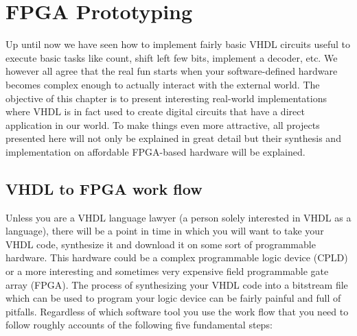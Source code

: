 \documentclass[13pt]{extreport}
\begin{document}

\renewcommand\contentsname{Table of Contents}
\tableofcontents

\chapter{FPGA Prototyping}
Up until now we have seen how to implement fairly basic VHDL circuits useful to execute basic tasks like count, shift left few bits, implement a decoder, etc. We however all agree that the real fun starts when your software-defined hardware becomes complex enough to actually interact with the external world.
The objective of this chapter is to present interesting real-world implementations where VHDL is in fact used to create digital circuits that have a direct application in our world. To make things even more attractive, all projects presented here will not only be explained in great detail but their synthesis and implementation on affordable FPGA-based hardware will be explained.

\section{VHDL to FPGA work flow}
Unless you are a VHDL language lawyer (a person solely interested in VHDL as a language), there will be a point in time in which you will want to take your VHDL code, synthesize it and download it on some sort of programmable hardware. This hardware could be a complex programmable logic device (CPLD) or a more interesting and sometimes very expensive field programmable gate array (FPGA).
The process of synthesizing your VHDL code into a bitstream file which can be used to program your logic device can be fairly painful and full of pitfalls. Regardless of which software tool you use the work flow that you need to follow roughly accounts of the following five fundamental steps:
\end{document}

